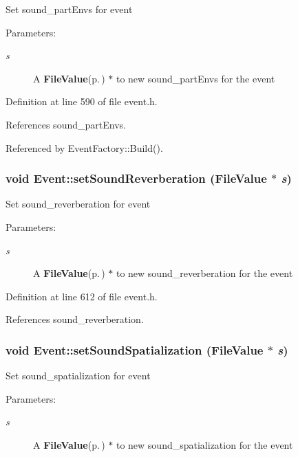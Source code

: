 Set sound\_\-part\-Envs for event \begin{Desc}
\item[Parameters:]
\begin{description}
\item[{\em s}]A {\bf File\-Value}{\rm (p.\,\pageref{classFileValue})} $\ast$ to new sound\_\-part\-Envs for the event \end{description}
\end{Desc}


Definition at line 590 of file event.h.

References sound\_\-part\-Envs.

Referenced by Event\-Factory::Build().
\subsubsection{\setlength{\rightskip}{0pt plus 5cm}void Event::set\-Sound\-Reverberation ({\bf File\-Value} $\ast$ {\em s})\hspace{0.3cm}{\tt  [inline]}}\label{classEvent_a73}


Set sound\_\-reverberation for event \begin{Desc}
\item[Parameters:]
\begin{description}
\item[{\em s}]A {\bf File\-Value}{\rm (p.\,\pageref{classFileValue})} $\ast$ to new sound\_\-reverberation for the event \end{description}
\end{Desc}


Definition at line 612 of file event.h.

References sound\_\-reverberation.
\subsubsection{\setlength{\rightskip}{0pt plus 5cm}void Event::set\-Sound\-Spatialization ({\bf File\-Value} $\ast$ {\em s})\hspace{0.3cm}{\tt  [inline]}}\label{classEvent_a75}


Set sound\_\-spatialization for event \begin{Desc}
\item[Parameters:]
\begin{description}
\item[{\em s}]A {\bf File\-Value}{\rm (p.\,\pageref{classFileValue})} $\ast$ to new sound\_\-spatialization for the event \end{description}
\end{Desc}



